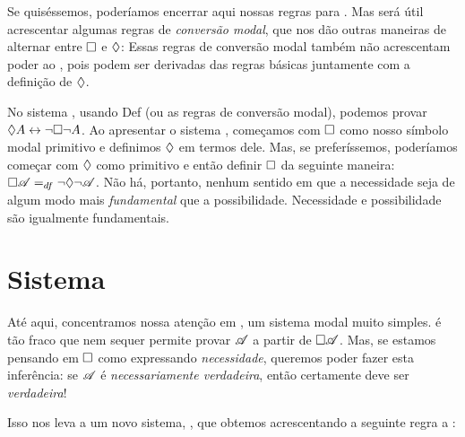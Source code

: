 Se quiséssemos, poderíamos encerrar aqui nossas regras para \mlK{}. Mas será útil acrescentar algumas regras de \emph{conversão modal}, que nos dão outras maneiras de alternar entre $\Box$ e $\Diamond$:
Essas regras de conversão modal também não acrescentam poder ao \mlK, pois podem ser derivadas das regras básicas juntamente com a definição de $\Diamond$.

No sistema \mlK, usando Def\ediamond{} (ou as regras de conversão modal), podemos provar $\Diamond A \leftrightarrow \neg\Box\neg A$. Ao apresentar o sistema \mlK, começamos com $\Box$ como nosso símbolo modal primitivo e definimos $\Diamond$ em termos dele. Mas, se preferíssemos, poderíamos começar com $\Diamond$ como primitivo e então definir $\Box$ da seguinte maneira: $\Box\mathscr{A} =_{df} \neg \Diamond \neg \mathscr{A}$. Não há, portanto, nenhum sentido em que a necessidade seja de algum modo mais \emph{fundamental} que a possibilidade. Necessidade e possibilidade são igualmente fundamentais.

\section{Sistema \mlT}
\label{T}

Até aqui, concentramos nossa atenção em \mlK, um sistema modal muito simples. \mlK{} é tão fraco que nem sequer permite provar $\mathscr{A}$ a partir de $\Box\mathscr{A}$. Mas, se estamos pensando em $\Box$ como expressando \emph{necessidade}, queremos poder fazer esta inferência: se $\mathscr{A}$ é \emph{necessariamente verdadeira}, então certamente deve ser \emph{verdadeira}!

Isso nos leva a um novo sistema, \mlT, que obtemos acrescentando a seguinte regra a \mlK:

